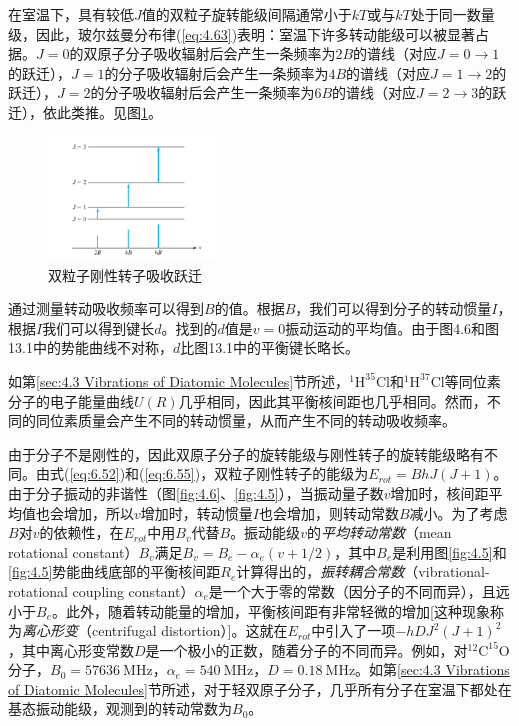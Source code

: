     在室温下，具有较低$J$值的双粒子旋转能级间隔通常小于$kT$或与$kT$处于同一数量级，因此，玻尔兹曼分布律(\ref{eq:4.63})表明：室温下许多转动能级可以被显著占据。$J=0$的双原子分子吸收辐射后会产生一条频率为$2B$的谱线（对应$J = 0 \to 1$的跃迁），$J=1$的分子吸收辐射后会产生一条频率为$4B$的谱线（对应$J = 1 \to 2$的跃迁），$J=2$的分子吸收辐射后会产生一条频率为$6B$的谱线（对应$J = 2 \to 3$的跃迁），依此类推。见图\ref{fig:6.4}。
    \begin{figure}[h!]
        \centering
        \includegraphics[width=0.4\textwidth]{Figures/6.4.png}
        \caption{双粒子刚性转子吸收跃迁}
        \label{fig:6.4}
    \end{figure}

    通过测量转动吸收频率可以得到$B$的值。根据$B$，我们可以得到分子的转动惯量$I$，根据$I$我们可以得到键长$d$。找到的$d$值是$v=0$振动运动的平均值。由于图4.6和图13.1中的势能曲线不对称，$d$比图13.1中的平衡键长略长。

    如第\ref{sec:4.3 Vibrations of Diatomic Molecules}节所述，$^1\mathrm{H}^{35}\mathrm{Cl}$和$^1\mathrm{H}^{37}\mathrm{Cl}$等同位素分子的电子能量曲线$U\left(R\right)$几乎相同，因此其平衡核间距也几乎相同。然而，不同的同位素质量会产生不同的转动惯量，从而产生不同的转动吸收频率。

    由于分子不是刚性的，因此双原子分子的旋转能级与刚性转子的旋转能级略有不同。由式(\ref{eq:6.52})和(\ref{eq:6.55})，双粒子刚性转子的能级为$E_{rot} = BhJ\left(J+1\right)$。由于分子振动的非谐性（图\ref{fig:4.6}、\ref{fig:4.5}），当振动量子数$v$增加时，核间距平均值也会增加，所以$v$增加时，转动惯量$I$也会增加，则转动常数$B$减小。为了考虑$B$对$v$的依赖性，在$E_{rot}$中用$B_v$代替$B$。振动能级$v$的\textit{平均转动常数}（mean rotational constant）$B_v$满足$B_v = B_e - \alpha_e\left(v+1/2\right)$，其中$B_e$是利用图\ref{fig:4.5}和\ref{fig:4.5}势能曲线底部的平衡核间距$R_e$计算得出的，\textit{振转耦合常数}（vibrational-rotational coupling constant）$\alpha_e$是一个大于零的常数（因分子的不同而异），且远小于$B_e$。此外，随着转动能量的增加，平衡核间距有非常轻微的增加[这种现象称为\textit{离心形变}（centrifugal distortion）]。这就在$E_{rot}$中引入了一项$-hDJ^2\left(J+1\right)^2$，其中离心形变常数$D$是一个极小的正数，随着分子的不同而异。例如，对$^{12}\mathrm{C}^{15}\mathrm{O}$分子，$B_0 = 57636 \: \mathrm{MHz}$，$\alpha_e = 540 \: \mathrm{MHz}$，$D = 0.18 \: \mathrm{MHz}$。如第\ref{sec:4.3 Vibrations of Diatomic Molecules}节所述，对于轻双原子分子，几乎所有分子在室温下都处在基态振动能级，观测到的转动常数为$B_0$。


